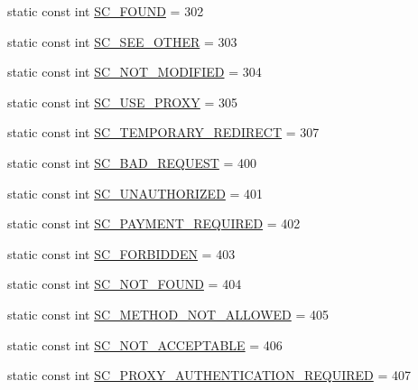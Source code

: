 \begin{DoxyCompactItemize}
\item 
static const int \hyperlink{class_c_w_f_1_1_http_servlet_response_a02d7f3f3f97fbad5efff90f7bcdbb13f}{S\+C\+\_\+\+F\+O\+U\+N\+D} = 302
\item 
static const int \hyperlink{class_c_w_f_1_1_http_servlet_response_af65f9f1e2173b2de3a3c3a8fb00946aa}{S\+C\+\_\+\+S\+E\+E\+\_\+\+O\+T\+H\+E\+R} = 303
\item 
static const int \hyperlink{class_c_w_f_1_1_http_servlet_response_af141e3a1b3a0cbe28e9d1c87bd0c2b82}{S\+C\+\_\+\+N\+O\+T\+\_\+\+M\+O\+D\+I\+F\+I\+E\+D} = 304
\item 
static const int \hyperlink{class_c_w_f_1_1_http_servlet_response_a30c0b9a751b9800a7258728630d59b63}{S\+C\+\_\+\+U\+S\+E\+\_\+\+P\+R\+O\+X\+Y} = 305
\item 
static const int \hyperlink{class_c_w_f_1_1_http_servlet_response_ad3f14a8c59022009dd2212eaa7467b93}{S\+C\+\_\+\+T\+E\+M\+P\+O\+R\+A\+R\+Y\+\_\+\+R\+E\+D\+I\+R\+E\+C\+T} = 307
\item 
static const int \hyperlink{class_c_w_f_1_1_http_servlet_response_ac85b62a3e41626ed44cec21e68c70839}{S\+C\+\_\+\+B\+A\+D\+\_\+\+R\+E\+Q\+U\+E\+S\+T} = 400
\item 
static const int \hyperlink{class_c_w_f_1_1_http_servlet_response_a41183944095a508eae07699093337031}{S\+C\+\_\+\+U\+N\+A\+U\+T\+H\+O\+R\+I\+Z\+E\+D} = 401
\item 
static const int \hyperlink{class_c_w_f_1_1_http_servlet_response_ad8d96b104eb03d08738dd5dc5f1d302c}{S\+C\+\_\+\+P\+A\+Y\+M\+E\+N\+T\+\_\+\+R\+E\+Q\+U\+I\+R\+E\+D} = 402
\item 
static const int \hyperlink{class_c_w_f_1_1_http_servlet_response_a899c9e06fb7475efbceccde31bc4b84c}{S\+C\+\_\+\+F\+O\+R\+B\+I\+D\+D\+E\+N} = 403
\item 
static const int \hyperlink{class_c_w_f_1_1_http_servlet_response_a9b6f0e3c1e5721d4544d5670261315a3}{S\+C\+\_\+\+N\+O\+T\+\_\+\+F\+O\+U\+N\+D} = 404
\item 
static const int \hyperlink{class_c_w_f_1_1_http_servlet_response_a256fa073bac8902a5339d87d5e201a6e}{S\+C\+\_\+\+M\+E\+T\+H\+O\+D\+\_\+\+N\+O\+T\+\_\+\+A\+L\+L\+O\+W\+E\+D} = 405
\item 
static const int \hyperlink{class_c_w_f_1_1_http_servlet_response_a6bee649100ca47b85e3514739299a41a}{S\+C\+\_\+\+N\+O\+T\+\_\+\+A\+C\+C\+E\+P\+T\+A\+B\+L\+E} = 406
\item 
static const int \hyperlink{class_c_w_f_1_1_http_servlet_response_a95dcdfcbe5a3e9aab19723899c25e492}{S\+C\+\_\+\+P\+R\+O\+X\+Y\+\_\+\+A\+U\+T\+H\+E\+N\+T\+I\+C\+A\+T\+I\+O\+N\+\_\+\+R\+E\+Q\+U\+I\+R\+E\+D} = 407

\end{DoxyCompactItemize}

